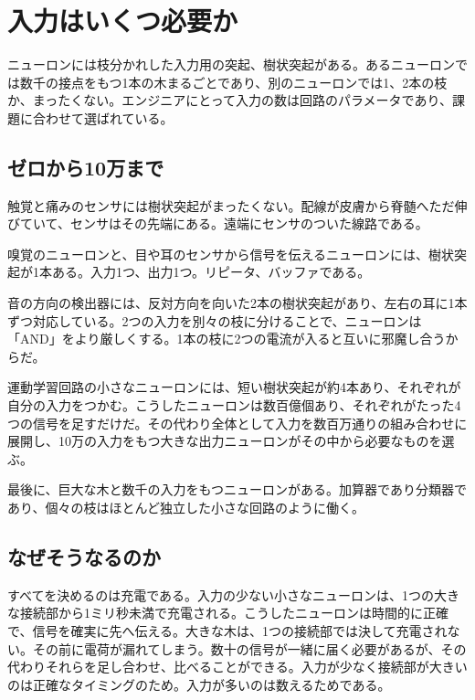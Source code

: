 \chapter{入力はいくつ必要か}

ニューロンには枝分かれした入力用の突起、樹状突起がある。あるニューロンでは数千の接点をもつ1本の木まるごとであり、別のニューロンでは1、2本の枝か、まったくない。エンジニアにとって入力の数は回路のパラメータであり、課題に合わせて選ばれている。

\section*{ゼロから10万まで}

触覚と痛みのセンサには樹状突起がまったくない。配線が皮膚から脊髄へただ伸びていて、センサはその先端にある。遠端にセンサのついた線路である。


嗅覚のニューロンと、目や耳のセンサから信号を伝えるニューロンには、樹状突起が1本ある。入力1つ、出力1つ。リピータ、バッファである。

音の方向の検出器には、反対方向を向いた2本の樹状突起があり、左右の耳に1本ずつ対応している。2つの入力を別々の枝に分けることで、ニューロンは「AND」をより厳しくする。1本の枝に2つの電流が入ると互いに邪魔し合うからだ。

運動学習回路の小さなニューロンには、短い樹状突起が約4本あり、それぞれが自分の入力をつかむ。こうしたニューロンは数百億個あり、それぞれがたった4つの信号を足すだけだ。その代わり全体として入力を数百万通りの組み合わせに展開し、10万の入力をもつ大きな出力ニューロンがその中から必要なものを選ぶ。

最後に、巨大な木と数千の入力をもつニューロンがある。加算器であり分類器であり、個々の枝はほとんど独立した小さな回路のように働く。

\section*{なぜそうなるのか}

すべてを決めるのは充電である。入力の少ない小さなニューロンは、1つの大きな接続部から1ミリ秒未満で充電される。こうしたニューロンは時間的に正確で、信号を確実に先へ伝える。大きな木は、1つの接続部では決して充電されない。その前に電荷が漏れてしまう。数十の信号が一緒に届く必要があるが、その代わりそれらを足し合わせ、比べることができる。入力が少なく接続部が大きいのは正確なタイミングのため。入力が多いのは数えるためである。

